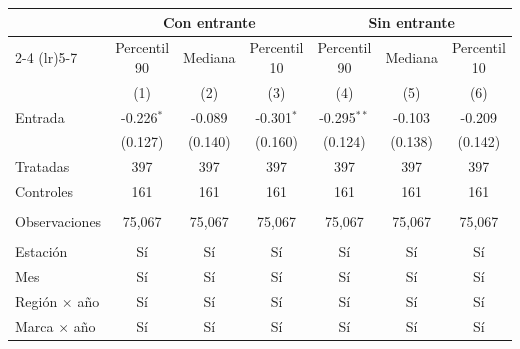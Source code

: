 
\begingroup
\centering
\begin{tabular}{lcccccc}
   \toprule
    & \multicolumn{3}{c}{Con entrante} & \multicolumn{3}{c}{Sin entrante} \\ \cmidrule(lr){2-4} \cmidrule(lr){5-7}
                        & Percentil 90 & Mediana & Percentil 10 & Percentil 90  & Mediana & Percentil 10 \\   
                        & (1)          & (2)     & (3)          & (4)           & (5)     & (6)\\  
   \midrule 
   Entrada              & -0.226$^{*}$ & -0.089  & -0.301$^{*}$ & -0.295$^{**}$ & -0.103  & -0.209\\   
                        & (0.127)      & (0.140) & (0.160)      & (0.124)       & (0.138) & (0.142)\\   
   Tratadas             & 397          & 397     & 397          & 397           & 397     & 397\\  
   Controles            & 161          & 161     & 161          & 161           & 161     & 161\\  
    \\
   Observaciones        & 75,067       & 75,067  & 75,067       & 75,067        & 75,067  & 75,067\\  
    \\
   Estación             & Sí           & Sí      & Sí           & Sí            & Sí      & Sí\\  
   Mes                  & Sí           & Sí      & Sí           & Sí            & Sí      & Sí\\  
   Región $\times$ año  & Sí           & Sí      & Sí           & Sí            & Sí      & Sí\\  
   Marca $\times$ año   & Sí           & Sí      & Sí           & Sí            & Sí      & Sí\\  
   \bottomrule
\end{tabular}
\par\endgroup


